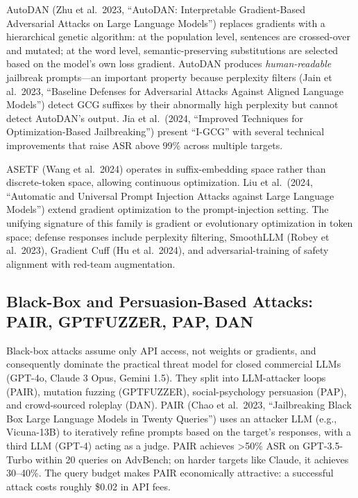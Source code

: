 AutoDAN (Zhu et al.~2023, ``AutoDAN: Interpretable Gradient-Based Adversarial Attacks on Large Language Models'') replaces gradients with a hierarchical genetic algorithm: at the population level, sentences are crossed-over and mutated; at the word level, semantic-preserving substitutions are selected based on the model's own loss gradient. AutoDAN produces \emph{human-readable} jailbreak prompts---an important property because perplexity filters (Jain et al.~2023, ``Baseline Defenses for Adversarial Attacks Against Aligned Language Models'') detect GCG suffixes by their abnormally high perplexity but cannot detect AutoDAN's output. Jia et al.~(2024, ``Improved Techniques for Optimization-Based Jailbreaking'') present ``I-GCG'' with several technical improvements that raise ASR above 99\% across multiple targets.

ASETF (Wang et al.~2024) operates in suffix-embedding space rather than discrete-token space, allowing continuous optimization. Liu et al.~(2024, ``Automatic and Universal Prompt Injection Attacks against Large Language Models'') extend gradient optimization to the prompt-injection setting. The unifying signature of this family is gradient or evolutionary optimization in token space; defense responses include perplexity filtering, SmoothLLM (Robey et al.~2023), Gradient Cuff (Hu et al.~2024), and adversarial-training of safety alignment with red-team augmentation.

\subsection{Black-Box and Persuasion-Based Attacks: PAIR, GPTFUZZER, PAP, DAN}\label{black-box-and-persuasion-based-attacks-pair-gptfuzzer-pap-dan}

Black-box attacks assume only API access, not weights or gradients, and consequently dominate the practical threat model for closed commercial LLMs (GPT-4o, Claude 3 Opus, Gemini 1.5). They split into LLM-attacker loops (PAIR), mutation fuzzing (GPTFUZZER), social-psychology persuasion (PAP), and crowd-sourced roleplay (DAN). PAIR (Chao et al.~2023, ``Jailbreaking Black Box Large Language Models in Twenty Queries'') uses an attacker LLM (e.g., Vicuna-13B) to iteratively refine prompts based on the target's responses, with a third LLM (GPT-4) acting as a judge. PAIR achieves \textgreater50\% ASR on GPT-3.5-Turbo within 20 queries on AdvBench; on harder targets like Claude, it achieves 30--40\%. The query budget makes PAIR economically attractive: a successful attack costs roughly \$0.02 in API fees.

